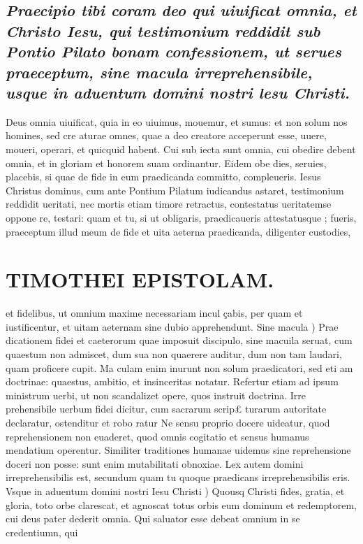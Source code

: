\documentclass{article}
\begin{document}
\begin{pages}
\subsection*{\textit{Praecipio tibi coram deo qui uiuificat omnia, et Christo Iesu, qui testimonium reddidit sub Pontio Pilato bonam confessionem, ut serues praeceptum, sine macula irreprehensibile, usque in aduentum domini nostri lesu Christi. }}\pstart Deus omnia uiuificat, quia in eo uiuimus, mouemur, et sumus: et non solum nos homines, sed cre aturae omnes, quae a deo creatore acceperunt esse, uuere, moueri, operari, et quicquid habent. Cui sub iecta sunt omnia, cui obedire debent omnia, et in gloriam et honorem suam ordinantur. Eidem obe dies, seruies, placebis, si quae de fide in eum praedicanda committo, compleueris. Iesus Christus dominus, cum ante Pontium Pilatum iudicandus astaret, testimonium reddidit ueritati, nec mortis etiam timore retractus, contestatus ueritatemse oppone re, testari: quam et tu, si ut obligaris, praedicaueris attestatusque ; fueris, praeceptum illud meum de fide et uita aeterna praedicanda, diligenter custodies,  \pend
\section*{TIMOTHEI EPISTOLAM. }
\marginpar{[ p.173 ]}\pstart et fidelibus, ut omnium maxime necessariam incul çabis, per quam et iustificentur, et uitam aeternam sine dubio apprehendunt.  \pend\pstart Sine macula ) Prae dicationem fidei et caeterorum quae imposuit discipulo, sine macuila seruat, cum quaestum non admiscet, dum sua non quaerere auditur, dum non tam laudari, quam proficere cupit. Ma culam enim inurunt non solum praedicatori, sed eti am doctrinae: quaestus, ambitio, et insinceritas notatur. Refertur etiam ad ipsum ministrum uerbi, ut non scandalizet opere, quos instruit doctrina. Irre prehensibile uerbum fidei dicitur, cum sacrarum scrip£ turarum autoritate declaratur, ostenditur et robo ratur Ne sensu proprio docere uideatur, quod reprehensionem non euaderet, quod omnis cogitatio et sensus humanus mendatium operentur. Similiter traditiones humanae uidemus sine reprehensione doceri non posse: sunt enim mutabilitati obnoxiae. Lex autem domini irreprehensibilis est, secundum quam tu quoque praedicans irreprehensibilis eris.  \pend\pstart Vsque in aduentum domini nostri Iesu Christi ) Quousq Christi fides, gratia, et gloria, toto orbe clarescat, et agnoscat totus orbis eum dominum et redemptorem, cui deus pater dederit omnia. Qui saluator esse debeat omnium in se credentiumn, qui  \pend

\end{pages}
\end{document}
